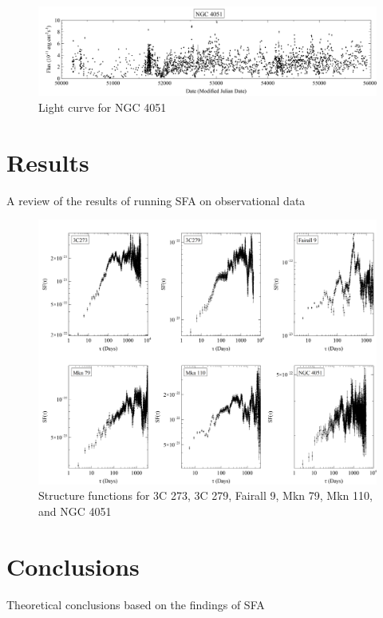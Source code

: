 \documentclass[12pt, oneside]{smuthesis}
\begin{document}
\begin{figure}[H]
\centering
\includegraphics[width=\linewidth]{NGC4051lightcurve}
\caption{Light curve for NGC 4051}
\label{fig:ngc4051lc}
\end{figure}

\section{\sc Results} \label{results}

A review of the results of running SFA on observational data

\begin{figure}[H]
	\centering
	\includegraphics[width=\linewidth]{combinedstructurefunctions}
	\caption{Structure functions for 3C 273, 3C 279, Fairall 9, Mkn 79, Mkn 110, and NGC 4051}
	\label{fig:combosf}
\end{figure}

\section{\sc Conclusions} \label{conclusions}

Theoretical conclusions based on the findings of SFA
\end{document}
